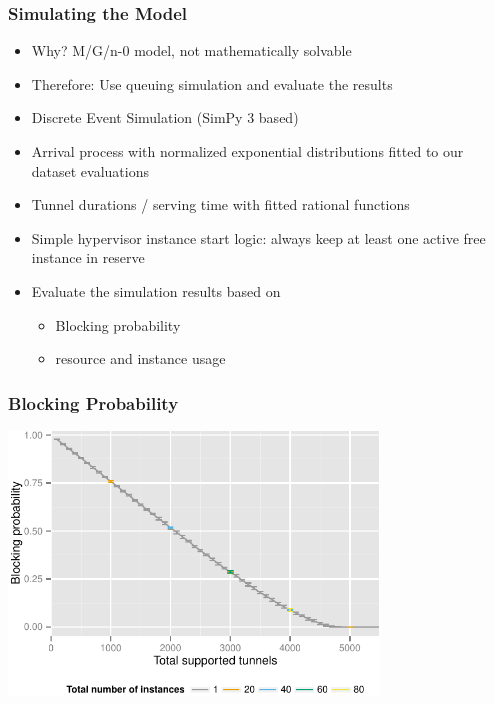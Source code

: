 \documentclass{beamer}
\begin{document}





\begin{frame}
	\frametitle{Simulating the Model}

	\begin{itemize}
		\item Why? M/G/n-0 model, not mathematically solvable
		\item Therefore: Use queuing simulation and evaluate the results
		\item Discrete Event Simulation (SimPy 3 based)
		\item Arrival process with normalized exponential distributions fitted to our dataset evaluations
		\item Tunnel durations / serving time with fitted rational functions
		\item Simple hypervisor instance start logic: always keep at least one active free instance in reserve
		\item Evaluate the simulation results based on
		\begin{itemize}
			\item Blocking probability
			\item resource and instance usage
		\end{itemize}
	\end{itemize}

\end{frame}


\begin{frame}
	\frametitle{Blocking Probability}

	\begin{center}
		\includegraphics[height=7cm]{figures/virtual-blocking.pdf}
	\end{center}
\end{frame}
\end{document}
